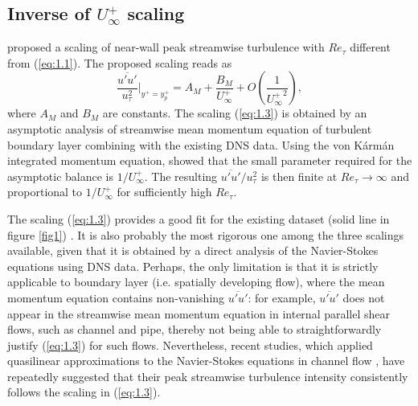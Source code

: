 \documentclass{jfm}
\begin{document}
\subsection{Inverse of $U_{\infty}^+$ scaling}\label{sec:1.2}
\cite{Monkewitz2015} proposed a scaling of near-wall peak streamwise turbulence with $Re_\tau$ different from (\ref{eq:1.1}). The proposed scaling reads as
\begin{equation}\label{eq:1.3}
\frac{\overline{u'u'}}{u_\tau^2}\Big|_{y^+=y^+_{p}}=A_{M}+\frac{B_M}{U_{\infty}^+}+O\left(\frac{1}{{U_{\infty}^+}^2}\right),
\end{equation}
where $A_M$ and $B_M$ are constants. %
The scaling (\ref{eq:1.3}) is obtained by an asymptotic analysis of streamwise mean momentum equation of turbulent boundary layer combining with the existing DNS data. Using the von K\'{a}rm\'{a}n integrated momentum equation, \cite{Monkewitz2015} showed that the small parameter required for the asymptotic balance is $1/U_\infty^+$. The resulting ${\overline{u'u'}}/u_\tau^2$ is then finite at $Re_\tau \rightarrow \infty$ and proportional to $1/U_\infty^+$ for sufficiently high $Re_\tau$. %

The scaling (\ref{eq:1.3}) provides a good fit for the existing dataset (solid line in figure \ref{fig1}) \cite[see also][]{Monkewitz2022}. It is also probably the most rigorous one among the three scalings available, given that it is obtained by a direct analysis of the Navier-Stokes equations using DNS data. Perhaps, the only limitation is that it is strictly applicable to boundary layer (i.e. spatially developing flow), where the mean momentum equation contains non-vanishing ${\overline{u'u'}}$: for example, ${\overline{u'u'}}$ does not appear in the streamwise mean momentum equation in internal parallel shear flows, such as channel and pipe, thereby not being able to straightforwardly justify (\ref{eq:1.3}) for such flows. Nevertheless, recent studies, which applied quasilinear approximations to the Navier-Stokes equations in channel flow \cite[]{Hwang2020a,Skouloudis2021,Holford2023b}, have repeatedly suggested that their peak streamwise turbulence intensity consistently follows the scaling in (\ref{eq:1.3}).%
\end{document}
